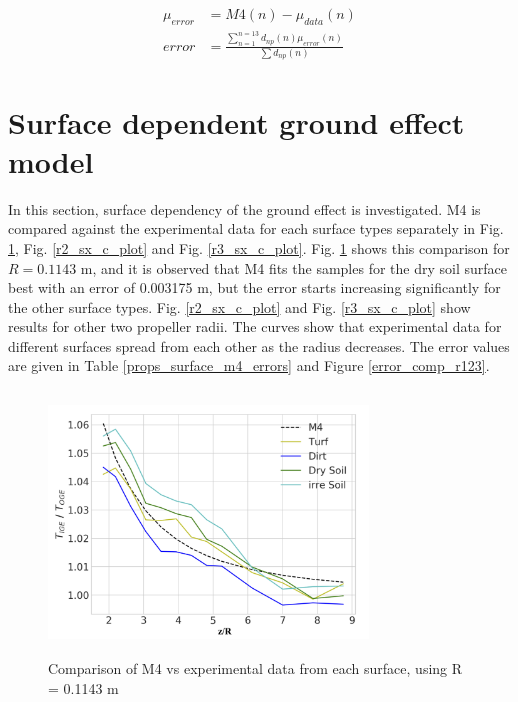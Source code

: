 \documentclass[twocolumn,10pt]{asme2ej}
\begin{document}
\begin{align}
  \mu_{error} &=  M4(n) - \mu_{data}(n) \label{error_mean} \\ 
  error &= \frac{ \sum_{n=1}^{n=13} d_{np}(n) \mu_{error}(n) }{\sum d_{np}(n)} \label{errors_}
\end{align}

\section{Surface dependent ground effect model}
In this section, surface dependency of the ground effect is investigated. M4 is compared against the experimental data for each surface types separately in Fig. \ref{r1_sx_c_plot}, Fig. \ref{r2_sx_c_plot} and Fig. \ref{r3_sx_c_plot}. Fig. \ref{r1_sx_c_plot} shows this comparison for $R=0.1143$ m, and it is observed that M4 fits the samples for the dry soil surface best with an error of 0.003175 m, but the error starts increasing significantly for the other surface types. Fig. \ref{r2_sx_c_plot} and Fig. \ref{r3_sx_c_plot} show results for other two propeller radii. The curves show that experimental data for different surfaces spread from each other as the radius decreases. The error values are given in Table \ref{props_surface_m4_errors} and Figure \ref{error_comp_r123}.

\begin{figure}[t]
  \begin{center}
  \setlength{\unitlength}{0.012500in}%
  \includegraphics[width=8.5cm, height=7cm]{Images/r1_surface_comp.png}
  \caption{Comparison of M4 vs experimental data from each surface, using R = 0.1143 m}
  \end{center}
  \label{r1_sx_c_plot}
\end{figure}
\end{document}
